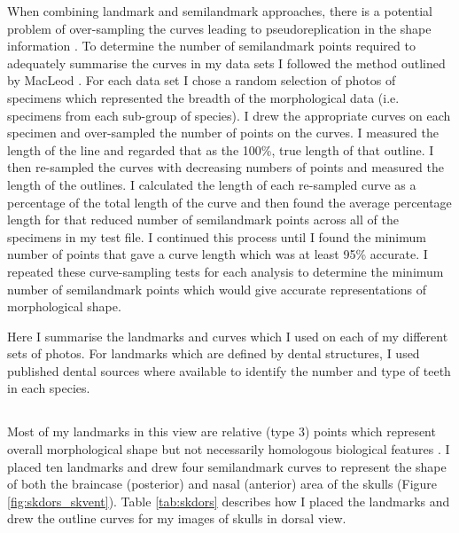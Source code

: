 	When combining landmark and semilandmark approaches, there is a potential problem of over-sampling the curves leading to pseudoreplication in the shape information %
	\citep{MacLeod2012}. To determine the number of semilandmark points required to adequately summarise the curves in my data sets I followed the method outlined by MacLeod \citeyearpar{MacLeod2012}. For each data set I chose a random selection of photos of specimens which represented the breadth of the morphological data (i.e. specimens from each sub-group of species). I drew the appropriate curves on each specimen and over-sampled the number of points on the curves. I measured the length of the line and regarded that as the 100\%, true length of that outline. I then re-sampled the curves with decreasing numbers of points and measured the length of the outlines. I calculated the length of each re-sampled curve as a percentage of the total length of the curve and then found the average percentage length for that reduced number of semilandmark points across all of the specimens in my test file. I continued this process until I found the minimum number of points that gave a curve length which was at least 95\% accurate.  I repeated these curve-sampling tests for each analysis to determine the minimum number of semilandmark points which would give accurate representations of morphological shape.
	
	Here I summarise the landmarks and curves which I used on each of my different sets of photos. For landmarks which are defined by dental structures, I used published dental sources \citep{Repenning1967, Eisenberg1969, Nowak1983, MacPhee1987, KnoxJones1992, Davis1997, Querouil2001, Nagorsen2002, Wilson2005, Goodman2006, Karatas2007, Hoffmann2008, Asher2008,  Muldoon2009, Lin2010} where available to identify the number and type of teeth in each species.
	
\subsection{}
	Most of my landmarks in this view are relative (type 3) points which represent overall morphological shape but not necessarily homologous biological features \citep{Zelditch2012}. I placed ten landmarks and drew four semilandmark curves to represent the shape of both the braincase (posterior) and nasal (anterior) area of the skulls (Figure \ref{fig:skdors_skvent}). Table \ref{tab:skdors} describes how I placed the landmarks and drew the outline curves for my images of skulls in dorsal view.

